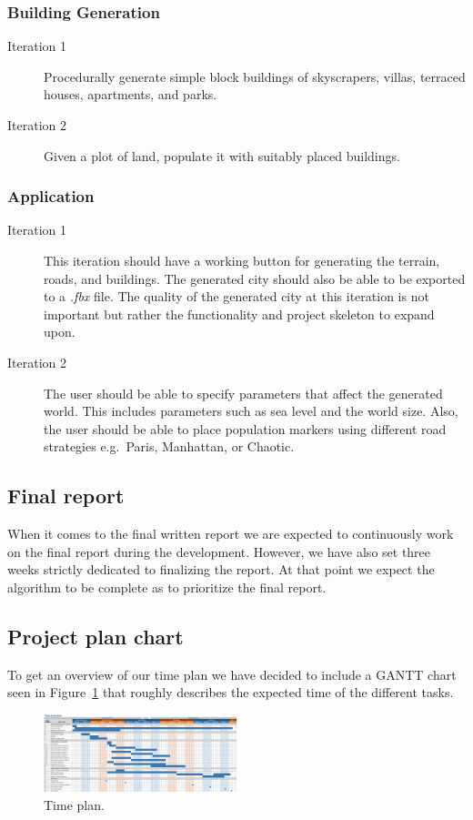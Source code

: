 \subsubsection{Building Generation}
\begin{description}
  \item[Iteration 1] Procedurally generate simple block buildings of skyscrapers, villas, terraced houses, apartments, and parks.
  \item[Iteration 2] Given a plot of land, populate it with suitably placed buildings.
\end{description}

\subsubsection{Application}
\begin{description}
  \item[Iteration 1]
    This iteration should have a working button for generating the terrain, roads, and buildings.
    The generated city should also be able to be exported to a \textit{.fbx} file.
    The quality of the generated city at this iteration is not important but rather the functionality and project skeleton to expand upon.
  \item[Iteration 2]
    The user should be able to specify parameters that affect the generated world.
    This includes parameters such as sea level and the world size.
    Also, the user should be able to place population markers using different road strategies e.g.\ Paris, Manhattan, or Chaotic.
\end{description}

\subsection{Final report}
When it comes to the final written report we are expected to continuously work on the final report during the development.
However, we have also set three weeks strictly dedicated to finalizing the report.
At that point we expect the algorithm to be complete as to prioritize the final report.

\subsection{Project plan chart}
To get an overview of our time plan we have decided to include a GANTT chart seen in Figure~\ref{fig:time-plan} that roughly describes the expected time of the different tasks.

\newpage
\begin{figure}[H]
  \centering
  \vspace*{-1.0cm}
  \includegraphics[angle=90, width=0.5\textwidth]{figure/time-plan.png}
  \caption{Time plan.}
  \label{fig:time-plan}
\end{figure}

